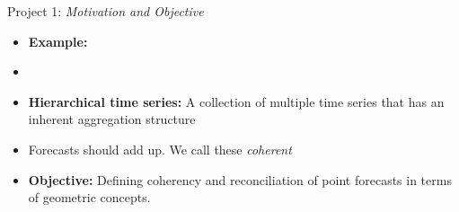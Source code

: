 \documentclass[11pt,xcolor=dvipsnames,handout]{beamer} %
\begin{document}
\begin{frame}[noframenumbering]{Project 1: \textit{Motivation and Objective}}
	\begin{itemize}[<+-| alert@+>]
			\item \textbf{Example:} 
			\begin{figure}
				
			\end{figure}
		\item []
		
		\item \textbf{Hierarchical time series:} A collection of multiple time series that has an inherent aggregation structure 
		\item Forecasts should add up. We call these \textit{coherent}
		\item \textbf{\color{Maroon}Objective:} Defining coherency and reconciliation of point forecasts in terms of geometric concepts.\\
		
		\end{itemize}
\end{frame}

\end{document}

